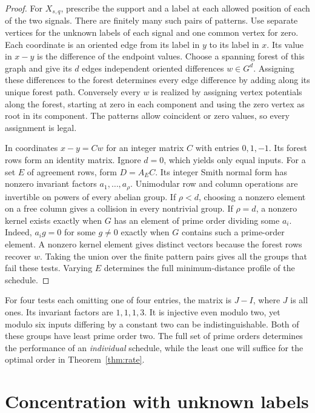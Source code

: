 \documentclass[11pt,letterpaper]{article}
\numberwithin{equation}{section}
\begin{document}
\begin{proof}

For $X_{s,q}$, prescribe the support and a label at each allowed position of each of the two
signals. There are finitely many such pairs of patterns. Use separate vertices for the unknown
labels of each signal and one common vertex for zero. Each coordinate is an oriented edge from
its label in $y$ to its label in $x$. Its value in $x-y$ is the difference of the endpoint
values. Choose a spanning forest of this graph and give its $d$ edges independent oriented
differences $w\in G^d$. Assigning these differences to the forest determines every edge
difference by adding along its unique forest path. Conversely every $w$ is realized by
assigning vertex potentials along the forest, starting at zero in each component and using the
zero vertex as root in its component. The patterns allow coincident or zero values, so every
assignment is legal.

In coordinates $x-y=Cw$ for an integer matrix $C$ with entries $0,1,-1$. Its forest rows form
an identity matrix. Ignore $d=0$, which yields only equal inputs. For a set $E$ of agreement
rows, form $D=A_E C$. Its integer Smith normal form has nonzero invariant factors
$a_1,\ldots,a_\rho$. Unimodular row and column operations are invertible on powers of every
abelian group. If $\rho<d$, choosing a nonzero element on a free column gives a collision in
every nontrivial group. If $\rho=d$, a nonzero kernel exists exactly when $G$ has an element
of prime order dividing some $a_i$. Indeed, $a_i g=0$ for some $g\ne0$ exactly when $G$
contains such a prime-order element. A nonzero kernel element gives distinct vectors because
the forest rows recover $w$. Taking the union over the finite pattern pairs gives all the
groups that fail these tests. Varying $E$ determines the full minimum-distance profile of the
schedule.
\end{proof}

For four tests each omitting one of four entries, the matrix is $J-I$, where $J$ is all ones.
Its invariant factors are $1,1,1,3$. It is injective even modulo two, yet modulo six inputs
differing by a constant two can be indistinguishable. Both of these groups have least prime
order two. The full set of prime orders determines the performance of an \emph{individual} schedule,
while the least one will suffice for the optimal order in Theorem~\ref{thm:rate}.

\section{Concentration with unknown labels}\label{sec:concentration}
\end{document}
